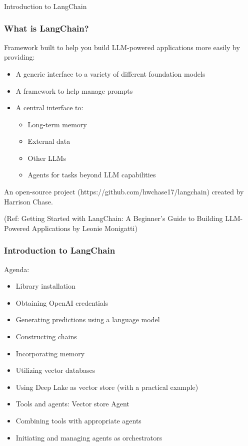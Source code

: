 \begin{frame}[fragile]\frametitle{}
\begin{center}
{\Large Introduction to LangChain}
\end{center}
\end{frame}

\begin{frame}\frametitle{What is LangChain?}

Framework built to help you build LLM-powered applications more easily by providing:

\begin{itemize}
\item A generic interface to a variety of different foundation models
\item A framework to help manage prompts 
\item A central interface to:
    \begin{itemize}
    \item Long-term memory
    \item External data
    \item Other LLMs
    \item Agents for tasks beyond LLM capabilities
    \end{itemize}
\end{itemize}

An open-source project (https://github.com/hwchase17/langchain) created by Harrison Chase.

{\tiny (Ref: Getting Started with LangChain: A Beginner's Guide to Building LLM-Powered Applications by Leonie Monigatti)}
\end{frame}

\begin{frame}[fragile]\frametitle{Introduction to LangChain}

Agenda:
\begin{itemize}
    \item Library installation
    \item Obtaining OpenAI credentials
    \item Generating predictions using a language model
    \item Constructing chains
    \item Incorporating memory
    \item Utilizing vector databases
    \item Using Deep Lake as vector store (with a practical example)
    \item Tools and agents: Vector store Agent
    \item Combining tools with appropriate agents
    \item Initiating and managing agents as orchestrators
\end{itemize}

\end{frame}


